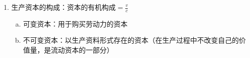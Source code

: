 \documentclass[12pt]{book}
\begin{document}
{\begin{enumerate}[1.]
\begin{enumerate}[(1)]
\begin{enumerate}[a.]
{                                      \par a. 定义：对固定资本价值转移量的计算以及从商品销售中逐步提取和回收这部分价值的方式
                                      \par b. 原因：损耗
                                      \par (a) 有形损耗（物质磨损）：使用；自然力
                                      \par (b) 无形损耗（精神磨损）：生产技术进步，生产效率提高，生产同类机器设备的社会必要劳动时间减少；科技创新，更好的机器设备
                                      \par * 流动资本：以原料、燃料及动力、辅助材料等劳动对象形式存在的以及用于购买劳动力的那部分生产资本（劳动对象，劳动者）
                                      \par * 固定资产：多个生产过程中价值分批转移，分批回收；较长的有效使用期内不必更新；回收期、周转期长
                                      \par * 流动资产：一个生产过程中价值一次全部转移，通过产品出售一次全部回收；每一生产周期前需更新；回收期、周转期短
                                  }
                        \end{enumerate}
                  \item 生产资本的构成：$\text{资本的有机构成}=\frac{v}{c}$
                        \begin{enumerate}[a.]
                            \item 可变资本：用于购买劳动力的资本
                            \item 不可变资本：以生产资料形式存在的资本（在生产过程中不改变自己的价值量，是流动资本的一部分）
                        \end{enumerate}
              \end{enumerate}
    \end{enumerate}
}
\end{document}
